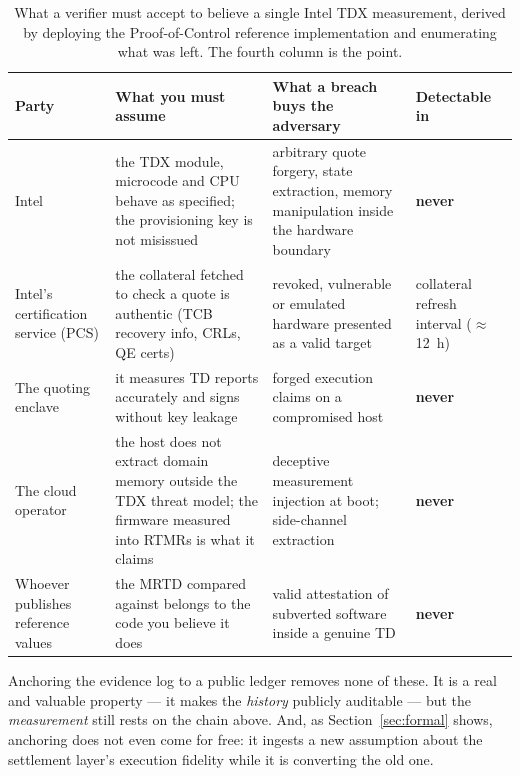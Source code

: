 \documentclass[11pt]{article}
\begin{document}
\begin{table}[h]
\centering\small
\caption{What a verifier must accept to believe a single Intel TDX
measurement, derived by deploying the Proof-of-Control reference
implementation and enumerating what was left. The fourth column is the point.}
\label{tab:tdx}
\setlength{\tabcolsep}{4pt}
\begin{tabular}{@{}>{\raggedright\arraybackslash}p{2.4cm}
                  >{\raggedright\arraybackslash}p{4.2cm}
                  >{\raggedright\arraybackslash}p{4.8cm}
                  >{\raggedright\arraybackslash}p{2.9cm}@{}}
\toprule
\textbf{Party} & \textbf{What you must assume} &
\textbf{What a breach buys the adversary} & \textbf{Detectable in} \\
\midrule
Intel &
the TDX module, microcode and CPU behave as specified; the provisioning key
is not misissued &
arbitrary quote forgery, state extraction, memory manipulation inside the
hardware boundary &
\textcolor{aaidarklime}{\textbf{never}} \\
\addlinespace
Intel's certification service (PCS) &
the collateral fetched to check a quote is authentic (TCB recovery info,
CRLs, QE certs) &
revoked, vulnerable or emulated hardware presented as a valid target &
collateral refresh interval ($\approx$\,\SI{12}{\hour}) \\
\addlinespace
The quoting enclave &
it measures TD reports accurately and signs without key leakage &
forged execution claims on a compromised host &
\textcolor{aaidarklime}{\textbf{never}} \\
\addlinespace
The cloud operator &
the host does not extract domain memory outside the TDX threat model; the
firmware measured into RTMRs is what it claims &
deceptive measurement injection at boot; side-channel extraction &
\textcolor{aaidarklime}{\textbf{never}} \\
\addlinespace
Whoever publishes reference values &
the MRTD compared against belongs to the code you believe it does &
valid attestation of subverted software inside a genuine TD &
\textcolor{aaidarklime}{\textbf{never}} \\
\bottomrule
\end{tabular}
\end{table}

Anchoring the evidence log to a public ledger removes none of these. It is a
real and valuable property --- it makes the \emph{history} publicly auditable
--- but the \emph{measurement} still rests on the chain above. And, as
Section~\ref{sec:formal} shows, anchoring does not even come for free: it
ingests a new assumption about the settlement layer's execution fidelity
while it is converting the old one.
\end{document}
